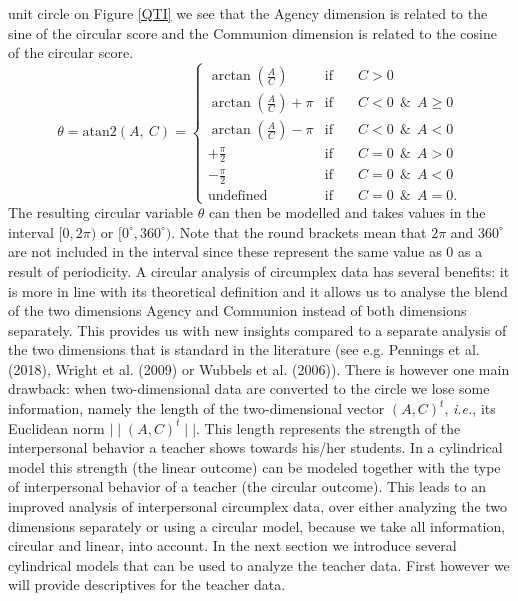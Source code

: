 \documentclass[man,mask]{apa6}
\begin{document}
unit circle on Figure \ref{QTI} we see that the Agency dimension is related to
the sine of the circular score and the Communion dimension is related to the
cosine of the circular score.
\begin{equation}\label{PredVal}
\theta          = \text{atan2}\left(A, \: C\right)  =
\left\{{\begin{array}{lcl}
                                                                       \arctan\left(\frac{A}{C}\right) & \text{if}  \quad&C > 0 \\
\arctan\left(\frac{A}{C}\right) + \pi & \text{if}  \quad& C  <  0  \:\: \&\:\: A \geq 0\\
 \arctan\left(\frac{A}{C}\right) - \pi & \text{if}  \quad&C  <  0 \:\:  \&\:\:A  < 0\\
 +\frac{\pi}{2} & \text{if}  \quad& C  =  0  \:\: \&\:\:A > 0\\
 -\frac{\pi}{2} & \text{if}  \quad& C =  0  \:\: \&\:\:A < 0\\
 \text{undefined} & \text{if} \quad& C =  0   \:\: \&\:\:A = 0.
 \end{array}}
\right.
\end{equation}
The resulting circular variable \(\theta\) can then be modelled and takes values
in the interval \([0, 2\pi)\) or \([0^\circ, 360^\circ)\). Note that the round
brackets mean that \(2\pi\) and \(360^\circ\) are not included in the interval since
these represent the same value as 0 as a result of periodicity. \newline
\indent A circular analysis of circumplex data has several benefits: it is more
in line with its theoretical definition and it allows us to analyse the blend of
the two dimensions Agency and Communion instead of both dimensions separately.
This provides us with new insights compared to a separate analysis of the two
dimensions that is standard in the literature (see e.g.
Pennings et al. (2018), Wright et al. (2009) or
Wubbels et al. (2006)). There is however one main drawback: when
two-dimensional data are converted to the circle we lose some information,
namely the length of the two-dimensional vector \((A, C)^t\), \emph{i.e.}, its
Euclidean norm \(\mid\mid (A, C)^t \mid\mid\). This length represents the
strength of the interpersonal behavior a teacher shows towards his/her students.
In a cylindrical model this strength (the linear outcome) can be modeled
together with the type of interpersonal behavior of a teacher (the circular
outcome). This leads to an improved analysis of interpersonal circumplex data,
over either analyzing the two dimensions separately or using a circular model,
because we take all information, circular and linear, into account. In the next
section we introduce several cylindrical models that can be used to analyze the
teacher data. First however we will provide descriptives for the teacher data.
\end{document}
